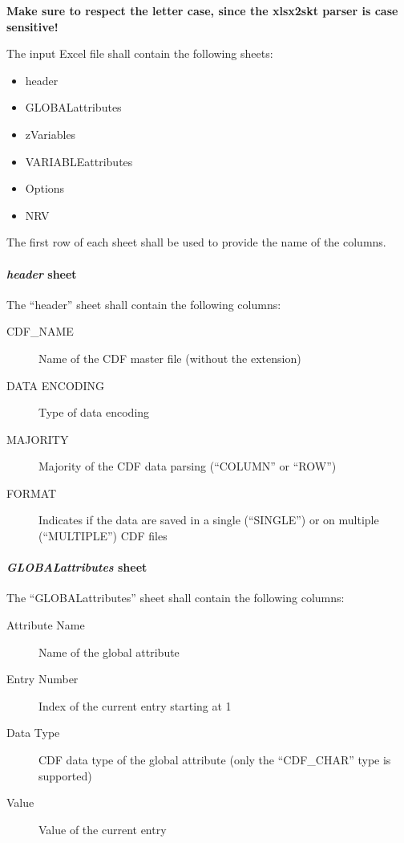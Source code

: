 \documentclass[letterpaper,10pt,english]{sphinxmanual}
\begin{document}
\textbf{Make sure to respect the letter case, since the xlsx2skt parser is case sensitive!}

The input Excel file shall contain the following sheets:
\begin{itemize}
\item {} 
header

\item {} 
GLOBALattributes

\item {} 
zVariables

\item {} 
VARIABLEattributes

\item {} 
Options

\item {} 
NRV

\end{itemize}

The first row of each sheet shall be used to provide the name of the columns.


\paragraph{\emph{header} sheet}
\label{cdf:header-sheet}
The ``header'' sheet shall contain the following columns:
\begin{description}
\item[{CDF\_NAME}] \leavevmode
Name of the CDF master file (without the extension)

\item[{DATA ENCODING}] \leavevmode
Type of data encoding

\item[{MAJORITY}] \leavevmode
Majority of the CDF data parsing (``COLUMN'' or ``ROW'')

\item[{FORMAT}] \leavevmode
Indicates if the data are saved in a single (``SINGLE'') or
on multiple (``MULTIPLE'') CDF files

\end{description}


\paragraph{\emph{GLOBALattributes} sheet}
\label{cdf:globalattributes-sheet}
The ``GLOBALattributes'' sheet shall contain the following columns:
\begin{description}
\item[{Attribute Name}] \leavevmode
Name of the global attribute

\item[{Entry Number}] \leavevmode
Index of the current entry starting at 1

\item[{Data Type}] \leavevmode
CDF data type of the global attribute (only the ``CDF\_CHAR'' type is supported)

\item[{Value}] \leavevmode
Value of the current entry

\end{description}
\end{document}
